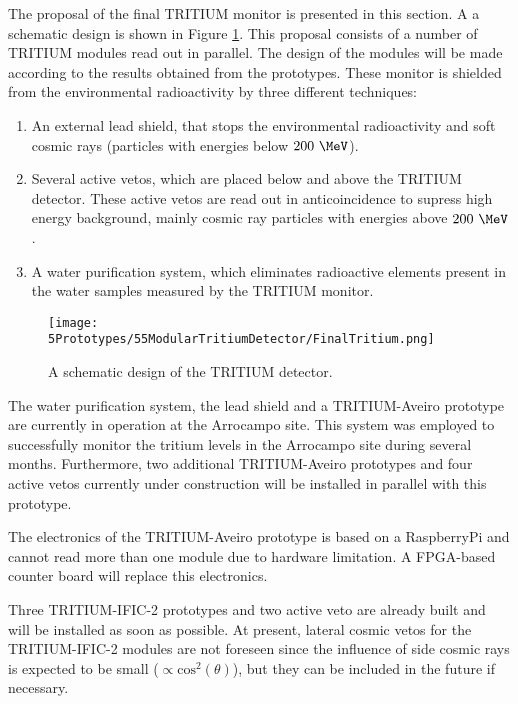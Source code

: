 The proposal of the final TRITIUM monitor is presented in this section. A a schematic design is shown in Figure \ref{fig:TritiumDetectorSchematicDesign}. This proposal consists of a number of TRITIUM modules read out in parallel. The design of the modules will be made according to the results obtained from the prototypes. These monitor is shielded from the environmental radioactivity by three different techniques:

\begin{enumerate}

\item{} An external lead shield, that stops the environmental radioactivity and soft cosmic rays (particles with energies below $200~\MeV$).

\item{} Several active vetos, which are placed below and above the TRITIUM detector. These active vetos are read out in anticoincidence to supress high energy background, mainly cosmic ray particles with energies above $200~\MeV$.

\item{} A water purification system, which eliminates radioactive elements present in the water samples measured by the TRITIUM monitor.

\end{enumerate}

\begin{figure}[h]
\centering
\texttt{[image: 5Prototypes/55ModularTritiumDetector/FinalTritium.png]}
\caption{A schematic design of the TRITIUM detector.\label{fig:TritiumDetectorSchematicDesign}}
\end{figure}

The water purification system, the lead shield and a TRITIUM-Aveiro prototype are currently in operation at the Arrocampo site. This system was employed to successfully monitor the tritium levels in the Arrocampo site during several months. Furthermore, two additional TRITIUM-Aveiro prototypes and four active vetos currently under construction will be installed in parallel with this prototype.

The electronics of the TRITIUM-Aveiro prototype is based on a RaspberryPi and cannot read more than one module due to hardware limitation. A FPGA-based counter board will replace this electronics.

Three TRITIUM-IFIC-2 prototypes and two active veto are already built and will be installed as soon as possible. At present, lateral cosmic vetos for the TRITIUM-IFIC-2 modules are not foreseen since the influence of side cosmic rays is expected to be small ($\propto \text{cos}^2(\theta)$), but they can be included in the future if necessary.


